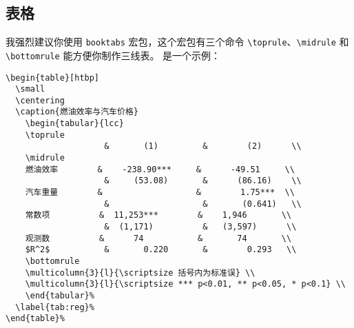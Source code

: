 \documentclass[lang=cn]{elegantpaper}
\begin{document}
\subsection{表格}
我强烈建议你使用 \lstinline{booktabs} 宏包，这个宏包有三个命令 \lstinline{\toprule}、\lstinline{\midrule} 和 \lstinline{\bottomrule} 能方便你制作三线表。 是一个示例：

\begin{lstlisting}
\begin{table}[htbp]
  \small
  \centering
  \caption{燃油效率与汽车价格}
    \begin{tabular}{lcc}
    \toprule
                    &       (1)         &        (2)      \\
    \midrule
    燃油效率        &    -238.90***     &      -49.51     \\
                    &     (53.08)       &      (86.16)    \\
    汽车重量        &                   &        1.75***  \\
                    &                   &       (0.641)   \\
    常数项          &  11,253***        &    1,946       \\
                    &  (1,171)          &   (3,597)      \\
    观测数          &      74           &       74       \\
    $R^2$           &       0.220       &        0.293   \\
    \bottomrule
    \multicolumn{3}{l}{\scriptsize 括号内为标准误} \\
    \multicolumn{3}{l}{\scriptsize *** p<0.01, ** p<0.05, * p<0.1} \\
    \end{tabular}%
  \label{tab:reg}%
\end{table}%
\end{lstlisting}
\end{document}
